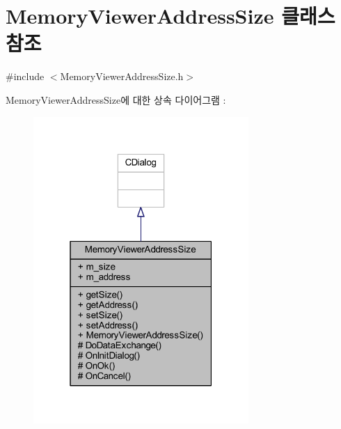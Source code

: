 \hypertarget{class_memory_viewer_address_size}{}\section{Memory\+Viewer\+Address\+Size 클래스 참조}
\label{class_memory_viewer_address_size}


{\ttfamily \#include $<$Memory\+Viewer\+Address\+Size.\+h$>$}



Memory\+Viewer\+Address\+Size에 대한 상속 다이어그램 \+: \nopagebreak
\begin{figure}[H]
\begin{center}
\leavevmode
\includegraphics[width=232pt]{class_memory_viewer_address_size__inherit__graph}
\end{center}
\end{figure}


